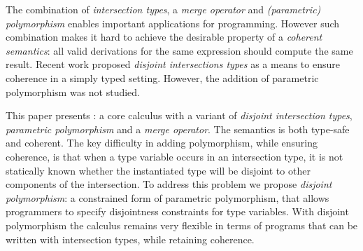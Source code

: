 The combination of \emph{intersection types}, a \emph{merge operator} 
and \emph{(parametric) polymorphism} enables
important applications for programming. However such combination makes
it hard to achieve the desirable property of a \emph{coherent
semantics}: all valid derivations for the same expression should
compute the same result. Recent work proposed \emph{disjoint
intersections types} as a means to ensure coherence in a simply typed
setting. However, the addition of parametric polymorphism was not
studied.

This paper presents \name: a core calculus with a variant of
\emph{disjoint intersection types}, \emph{parametric polymorphism} and a
\emph{merge operator}. The semantics \name is both type-safe and
coherent. The key difficulty in adding polymorphism, while ensuring
coherence, is that when a type variable occurs in an intersection
type, it is not statically known whether the instantiated type will be
disjoint to other components of the intersection. To address this
problem we propose \emph{disjoint polymorphism}: a constrained form of
parametric polymorphism, that allows programmers to specify
disjointness constraints for type variables. With disjoint
polymorphism the calculus remains very flexible in terms of programs
that can be written with intersection types, while retaining
coherence.

\begin{comment}
Coherence is achieved by ensuring that intersection types
are \emph{disjoint}. The approach works in the presence of parametric
polymorphism. However, parametric polymorphism makes the problem of coherence
significantly harder. When a type variable occurs in an intersection
type, it is not statically known whether the instantiated type will
be disjoint to other components of the intersection.
To address this problem we propose \emph{disjoint polymorphism}: a
constrained form of parametric polymorphism, that allows programmers
to specify disjointness constraints for type variables. With disjoint
polymorphism the calculus remains very flexible in terms of programs
that can be written with intersection types, while retaining coherence.
\end{comment}